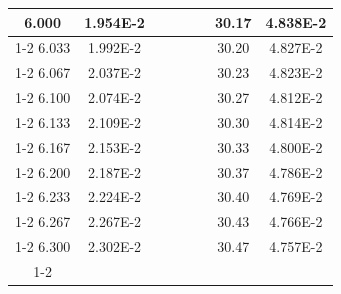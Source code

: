 \documentclass[article,12pt]{elsarticle}
\begin{document}
\begin{longtable}[c]{|c|c|cccccc}
6.000    & 1.954E-2  &                       &                              &                            & \multicolumn{1}{c|}{} & \multicolumn{1}{c|}{30.17}   & \multicolumn{1}{c|}{4.838E-2} \\ \cline{1-2} \cline{7-8} 
6.033    & 1.992E-2  &                       &                              &                            & \multicolumn{1}{c|}{} & \multicolumn{1}{c|}{30.20}   & \multicolumn{1}{c|}{4.827E-2} \\ \cline{1-2} \cline{7-8} 
6.067    & 2.037E-2  &                       &                              &                            & \multicolumn{1}{c|}{} & \multicolumn{1}{c|}{30.23}   & \multicolumn{1}{c|}{4.823E-2} \\ \cline{1-2} \cline{7-8} 
6.100    & 2.074E-2  &                       &                              &                            & \multicolumn{1}{c|}{} & \multicolumn{1}{c|}{30.27}   & \multicolumn{1}{c|}{4.812E-2} \\ \cline{1-2} \cline{7-8} 
6.133    & 2.109E-2  &                       &                              &                            & \multicolumn{1}{c|}{} & \multicolumn{1}{c|}{30.30}   & \multicolumn{1}{c|}{4.814E-2} \\ \cline{1-2} \cline{7-8} 
6.167    & 2.153E-2  &                       &                              &                            & \multicolumn{1}{c|}{} & \multicolumn{1}{c|}{30.33}   & \multicolumn{1}{c|}{4.800E-2} \\ \cline{1-2} \cline{7-8} 
6.200    & 2.187E-2  &                       &                              &                            & \multicolumn{1}{c|}{} & \multicolumn{1}{c|}{30.37}   & \multicolumn{1}{c|}{4.786E-2} \\ \cline{1-2} \cline{7-8} 
6.233    & 2.224E-2  &                       &                              &                            & \multicolumn{1}{c|}{} & \multicolumn{1}{c|}{30.40}   & \multicolumn{1}{c|}{4.769E-2} \\ \cline{1-2} \cline{7-8} 
6.267    & 2.267E-2  &                       &                              &                            & \multicolumn{1}{c|}{} & \multicolumn{1}{c|}{30.43}   & \multicolumn{1}{c|}{4.766E-2} \\ \cline{1-2} \cline{7-8} 
6.300    & 2.302E-2  &                       &                              &                            & \multicolumn{1}{c|}{} & \multicolumn{1}{c|}{30.47}   & \multicolumn{1}{c|}{4.757E-2} \\ \cline{1-2} \cline{7-8} 

\end{longtable}
\end{document}
